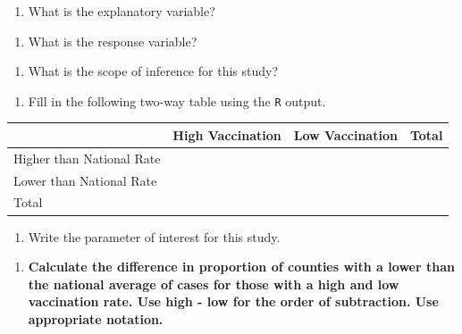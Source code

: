 \documentclass[
]{report}
\providecommand{\tightlist}{%
  \setlength{\itemsep}{0pt}\setlength{\parskip}{0pt}}
\begin{document}
\begin{enumerate}
\def\labelenumi{\arabic{enumi}.}
\tightlist
\item
  What is the explanatory variable?
\end{enumerate}

\vspace{0.5in}

\begin{enumerate}
\def\labelenumi{\arabic{enumi}.}
\setcounter{enumi}{1}
\tightlist
\item
  What is the response variable?
\end{enumerate}

\vspace{0.5in}

\begin{enumerate}
\def\labelenumi{\arabic{enumi}.}
\setcounter{enumi}{2}
\tightlist
\item
  What is the scope of inference for this study?
\end{enumerate}

\newpage

\begin{enumerate}
\def\labelenumi{\arabic{enumi}.}
\setcounter{enumi}{3}
\tightlist
\item
  Fill in the following two-way table using the \texttt{R} output.
\end{enumerate}

\begin{longtable}[]{@{}llll@{}}
\toprule
& High Vaccination & Low Vaccination & Total \\
\midrule
\endhead
Higher than National Rate & & & \\
Lower than National Rate & & & \\
Total & & & \\
\bottomrule
\end{longtable}

\begin{enumerate}
\def\labelenumi{\arabic{enumi}.}
\setcounter{enumi}{4}
\tightlist
\item
  Write the parameter of interest for this study.
\end{enumerate}

\vspace{1in}

\begin{enumerate}
\def\labelenumi{\arabic{enumi}.}
\setcounter{enumi}{5}
\tightlist
\item
  \textbf{Calculate the difference in proportion of counties with a lower than the national average of cases for those with a high and low vaccination rate. Use high - low for the order of subtraction. Use appropriate notation.}
\end{enumerate}
\end{document}
